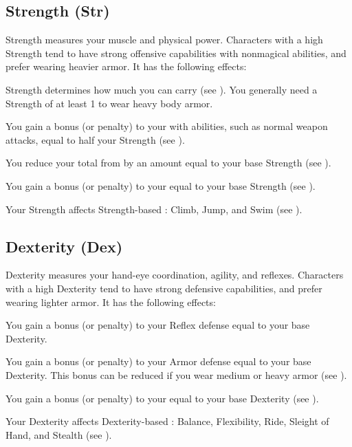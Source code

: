     \subsection{Strength (Str)}\label{Strength}
        {
            Strength measures your muscle and physical power.
            Characters with a high Strength tend to have strong offensive capabilities with nonmagical abilities, and prefer wearing heavier armor.
            It has the following effects:
            \begin{raggeditemize}
                \item Strength determines how much you can carry (see ).
                    You generally need a Strength of at least 1 to wear heavy body armor.
                \item You gain a bonus (or penalty) to your  with  abilities, such as normal weapon attacks, equal to half your Strength (see ).
                \item You reduce your total  from  by an amount equal to your base Strength (see ).
                \item You gain a bonus (or penalty) to your  equal to your base Strength (see ).
                \item Your Strength affects Strength-based : Climb, Jump, and Swim (see ).
            \end{raggeditemize}
        }

    \subsection{Dexterity (Dex)}\label{Dexterity}
        {
            Dexterity measures your hand-eye coordination, agility, and reflexes.
            Characters with a high Dexterity tend to have strong defensive capabilities, and prefer wearing lighter armor.
            It has the following effects:
            \begin{raggeditemize}
                \item You gain a bonus (or penalty) to your Reflex defense equal to your base Dexterity.
                \item You gain a bonus (or penalty) to your Armor defense equal to your base Dexterity.
                    This bonus can be reduced if you wear medium or heavy armor (see ).
                \item You gain a bonus (or penalty) to your  equal to your base Dexterity (see ).
                \item Your Dexterity affects Dexterity-based : Balance, Flexibility, Ride, Sleight of Hand, and Stealth (see ).
            \end{raggeditemize}
        }

